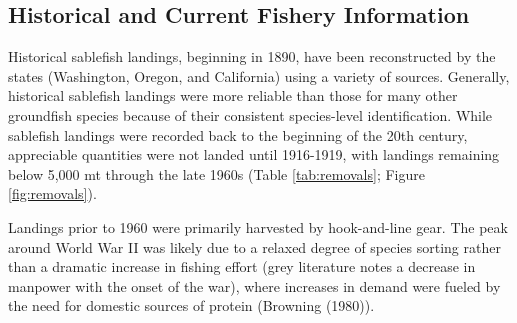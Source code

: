 \documentclass[11pt,
  english,
  a4paper,
]{article}
\begin{document}

\hypertarget{historical-and-current-fishery-information}{%
\subsection{Historical and Current Fishery Information}\label{historical-and-current-fishery-information}}

\leavevmode\tagmcend\tagstructend


Historical sablefish landings, beginning in 1890, have been reconstructed by the states (Washington, Oregon, and California) using a variety of sources. Generally, historical sablefish landings were more reliable than those for many other groundfish species because of their consistent species-level identification. While sablefish landings were recorded back to the beginning of the 20th century, appreciable quantities were not landed until 1916-1919, with landings remaining below 5,000 mt through the late 1960s (Table \ref{tab:removals}; Figure \ref{fig:removals}).

\leavevmode\tagmcend\tagstructend\par


Landings prior to 1960 were primarily harvested by hook-and-line gear. The peak around World War II was likely due to a relaxed degree of species sorting rather than a dramatic increase in fishing effort (grey literature notes a decrease in manpower with the onset of the war), where increases in demand were fueled by the need for domestic sources of protein ({Browning (1980)\leavevmode\tagmcend\tagstructend}).

\leavevmode\tagmcend\tagstructend\par

\end{document}
